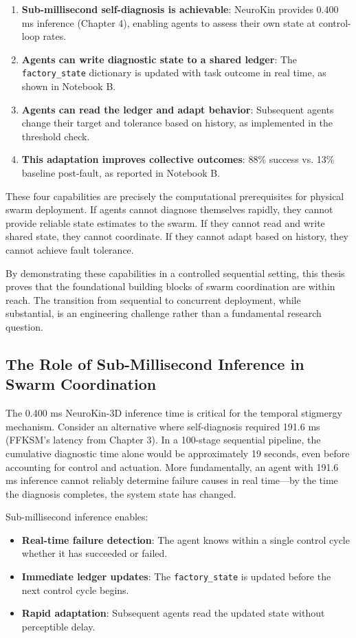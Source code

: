 ﻿\documentclass[12pt,a4paper,oneside]{report}
\begin{document}
\begin{enumerate}
    \item \textbf{Sub-millisecond self-diagnosis is achievable}: NeuroKin provides 0.400 ms inference (Chapter 4), enabling agents to assess their own state at control-loop rates.
    \item \textbf{Agents can write diagnostic state to a shared ledger}: The \texttt{factory\_state} dictionary is updated with task outcome in real time, as shown in Notebook B.
    \item \textbf{Agents can read the ledger and adapt behavior}: Subsequent agents change their target and tolerance based on history, as implemented in the threshold check.
    \item \textbf{This adaptation improves collective outcomes}: 88\% success vs. 13\% baseline post-fault, as reported in Notebook B.
\end{enumerate}

These four capabilities are precisely the computational prerequisites for physical swarm deployment. If agents cannot diagnose themselves rapidly, they cannot provide reliable state estimates to the swarm. If they cannot read and write shared state, they cannot coordinate. If they cannot adapt based on history, they cannot achieve fault tolerance.

By demonstrating these capabilities in a controlled sequential setting, this thesis proves that the foundational building blocks of swarm coordination are within reach. The transition from sequential to concurrent deployment, while substantial, is an engineering challenge rather than a fundamental research question.

\subsection{The Role of Sub-Millisecond Inference in Swarm Coordination}

The 0.400 ms NeuroKin-3D inference time is critical for the temporal stigmergy mechanism. Consider an alternative where self-diagnosis required 191.6 ms (FFKSM's latency from Chapter 3). In a 100-stage sequential pipeline, the cumulative diagnostic time alone would be approximately 19 seconds, even before accounting for control and actuation. More fundamentally, an agent with 191.6 ms inference cannot reliably determine failure causes in real time---by the time the diagnosis completes, the system state has changed.

Sub-millisecond inference enables:
\begin{itemize}
    \item \textbf{Real-time failure detection}: The agent knows within a single control cycle whether it has succeeded or failed.
    \item \textbf{Immediate ledger updates}: The \texttt{factory\_state} is updated before the next control cycle begins.
    \item \textbf{Rapid adaptation}: Subsequent agents read the updated state without perceptible delay.
\end{itemize}
\end{document}
